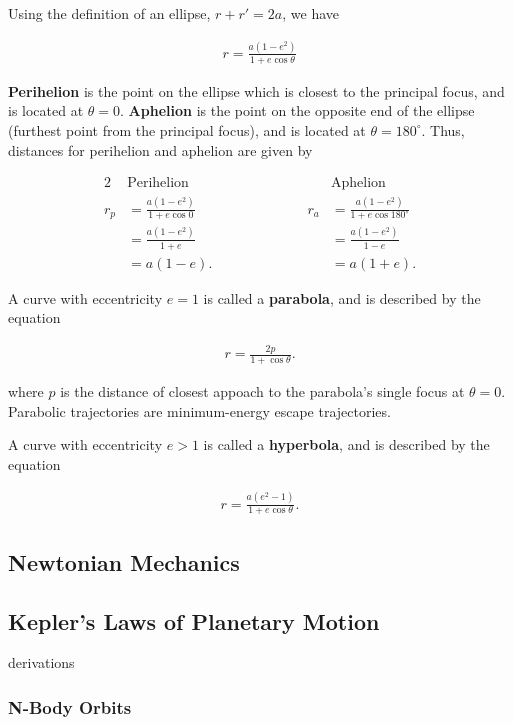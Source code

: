 \documentclass[a4paper,10pt]{article}
\begin{document}
Using the definition of an ellipse, $r+r'=2a$, we have 

\begin{align*}
    r = \frac{a(1-e^2)}{1+e\cos\theta}
\end{align*}

\textbf{Perihelion} is the point on the ellipse which is closest to the principal focus, and is located at $\theta=0$. \textbf{Aphelion} is the point on the opposite end of the ellipse (furthest point from the principal focus), and is located at $\theta=180^\circ$. Thus, distances for perihelion and aphelion are given by 

\begin{alignat*}{2}
    &\text{Perihelion} &&\text{Aphelion} \\[0.2cm]
    r_p &= \frac{a(1-e^2)}{1+e\cos 0} &\qquad\qquad\qquad r_a &= \frac{a(1-e^2)}{1+e\cos 180^\circ} \\
        &= \frac{a(1-e^2)}{1+e} &&= \frac{a(1-e^2)}{1-e} \\
        &= a(1-e). &&= a(1+e).
\end{alignat*}

A curve with eccentricity $e=1$ is called a \textbf{parabola}, and is described by the equation 

\begin{align*}
    r = \frac{2p}{1+\cos\theta}.
\end{align*}

where $p$ is the distance of closest appoach to the parabola's single focus at $\theta=0$. Parabolic trajectories are minimum-energy escape trajectories. 

A curve with eccentricity $e>1$ is called a \textbf{hyperbola}, and is described by the equation

\begin{align*}
    r = \frac{a(e^2-1)}{1+e\cos\theta}.
\end{align*}

\subsection{Newtonian Mechanics}

\subsection{Kepler's Laws of Planetary Motion}
derivations
\subsubsection{N-Body Orbits}
\end{document}
